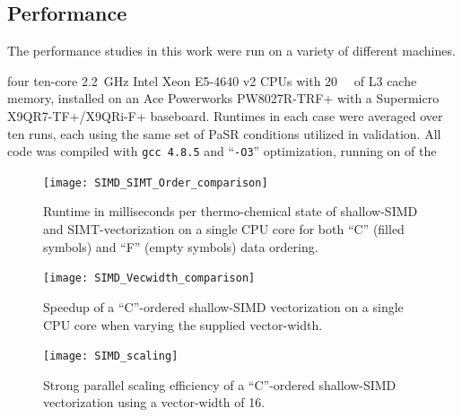 \documentclass[12pt,number,sort&compress]{elsarticle}
\begin{document}
\subsection{Performance}
\label{S:results}
The performance studies in this work were run on a variety of different machines.

four ten-core \SI{2.2}{\giga\hertz} Intel Xeon E5-4640 v2 CPUs with \SI{20}{\mega\byte} of L3 cache memory, installed on an Ace Powerworks PW8027R-TRF+ with a Supermicro X9QR7-TF+/X9QRi-F+ baseboard.
Runtimes in each case were averaged over ten runs, each using the same set of PaSR conditions utilized in validation.
All code was compiled with \texttt{gcc 4.8.5} and ``\texttt{-O3}'' optimization, running on  of the 

\begin{figure}[htb]
  \centering
  \begin{minipage}[t]{0.48\linewidth}
    \texttt{[image: SIMD\_SIMT\_Order\_comparison]}
    \caption{Runtime in milliseconds per thermo-chemical state of shallow-SIMD and SIMT-vectorization on a single CPU core for both ``C'' (filled symbols) and ``F'' (empty symbols) data ordering.}
    \label{F:SIMDComp}
  \end{minipage}
  \hfill
  \begin{minipage}[t]{0.48\linewidth}
    \texttt{[image: SIMD\_Vecwidth\_comparison]}
    \caption{Speedup of a ``C''-ordered shallow-SIMD vectorization on a single CPU core when varying the supplied vector-width.}
    \label{F:Veccomp}
  \end{minipage}
\end{figure}
\begin{figure}[htb]
  \centering
  \begin{minipage}[t]{0.5\linewidth}
    \texttt{[image: SIMD\_scaling]}
    \caption{Strong parallel scaling efficiency of a ``C''-ordered shallow-SIMD vectorization using a vector-width of 16.}
    \label{F:SIMDscale}
  \end{minipage}
\end{figure}
\end{document}
